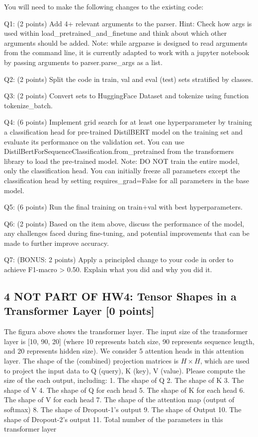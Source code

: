 \documentclass[
  letterpaper,
  DIV=11,
  numbers=noendperiod]{scrartcl}
\begin{document}
You will need to make the following changes to the existing code:

Q1: (2 points) Add 4+ relevant arguments to the parser. Hint: Check how
args is used within load\_pretrained\_and\_finetune and think about
which other arguments should be added. Note: while argparse is designed
to read arguments from the command line, it is currently adapted to work
with a jupyter notebook by passing arguments to parser.parse\_args as a
list.

Q2: (2 points) Split the code in train, val and eval (test) sets
stratified by classes.

Q3: (2 points) Convert sets to HuggingFace Dataset and tokenize using
function tokenize\_batch.

Q4: (6 points) Implement grid search for at least one hyperparameter by
training a classification head for pre-trained DistilBERT model on the
training set and evaluate its performance on the validation set. You can
use DistilBertForSequenceClassification.from\_pretrained from the
transformers library to load the pre-trained model. Note: DO NOT train
the entire model, only the classification head. You can initially freeze
all parameters except the classification head by setting
requires\_grad=False for all parameters in the base model.

Q5: (6 points) Run the final training on train+val with best
hyperparameters.

Q6: (2 points) Based on the item above, discuss the performance of the
model, any challenges faced during fine-tuning, and potential
improvements that can be made to further improve accuracy.

Q7: (BONUS: 2 points) Apply a principled change to your code in order to
achieve F1-macro \textgreater{} 0.50. Explain what you did and why you
did it.

\subsection{4 NOT PART OF HW4: Tensor Shapes in a Transformer Layer {[}0
points{]}}\label{not-part-of-hw4-tensor-shapes-in-a-transformer-layer-0-points}

The figura above shows the transformer layer. The input size of the
transformer layer is {[}10, 90, 20{]} (where 10 represents batch size,
90 represents sequence length, and 20 represents hidden size). We
consider 5 attention heads in this attention layer. The shape of the
(combined) projection matrices is \(H\times H\), which are used to
project the input data to Q (query), K (key), V (value). Please compute
the size of the each output, including: 1. The shape of Q 2. The shape
of K 3. The shape of V 4. The shape of Q for each head 5. The shape of K
for each head 6. The shape of V for each head 7. The shape of the
attention map (output of softmax) 8. The shape of Dropout-1's output 9.
The shape of Output 10. The shape of Dropout-2's output 11. Total number
of the parameters in this transformer layer
\end{document}

